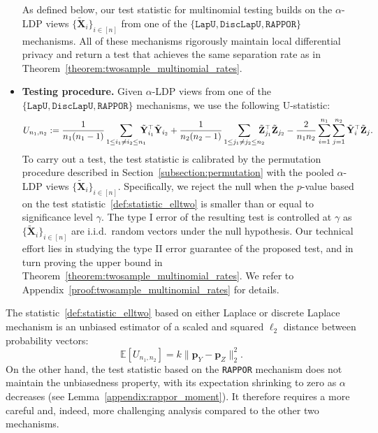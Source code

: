 \documentclass[twoside,11pt]{article}
\newcommand{\rvTwo}{Y}
\newcommand{\rvThree}{Z}
\newcommand{\vectorize}[1]{\mathbf{#1}}
\newcommand{\rvX}{X} %
\newcommand{\rVecX}{\vectorize{\rvX}}
\newcommand{\rVecXPriv}{\tilde{\rVecX}} %
\newcommand{\rvY}{Y}
\newcommand{\rVecY}{\vectorize{\rvY}}
\newcommand{\rvZ}{Z}
\newcommand{\rVecZ}{\vectorize{\rvZ}}
\newcommand{\mE}{\mathbb{E}} %
\newcommand{\alphabetSize}{k} %
\newcommand{\sampleSize}{n}
\newcommand{\probVec}{\mathbf{p}} %
\newcommand{\privacyParameter}{\alpha} %
\begin{document}
\begin{itemize}
As defined below, our test statistic for multinomial testing builds on the $\privacyParameter$-LDP views $\{\rVecXPriv_{i}\}_{i \in [n]}$ from one of the $\{\texttt{LapU}, \texttt{DiscLapU}, \texttt{RAPPOR}\}$ mechanisms. All of these mechanisms rigorously maintain local differential privacy and return a test that achieves the same separation rate as in Theorem~\ref{theorem:twosample_multinomial_rates}. 
\item \textbf{Testing procedure.}
 Given $\privacyParameter$-LDP views from one of the $\{\texttt{LapU}, \texttt{DiscLapU}, \texttt{RAPPOR}\}$ mechanisms, we use the following U-statistic:
\begin{equation}\label{def:statistic_elltwo}
	U_{\sampleSize_1,\sampleSize_2}
	:=
	\frac
	{1}
	{\sampleSize_1(\sampleSize_1-1)}
	\sum_{1 \leq i_1 \neq  i_2 \leq n_1}
\hskip	-3mm
	\tilde{\rVecY}_{i_1}^\top \tilde{\rVecY}_{i_2}
	+
	\frac{1}{\sampleSize_2(\sampleSize_2-1)}
	\sum_{1 \leq j_1 \neq  j_2 \leq n_2}
		\hskip -3mm
	\tilde{\rVecZ}_{j_1}^\top \tilde{\rVecZ}_{j_2}
	-
	\frac{2}{\sampleSize_1\sampleSize_2}
	\sum_{i=1}^{\sampleSize_1} \sum_{j=1}^{\sampleSize_2}
	\tilde{\rVecY}_i^\top \tilde{\rVecZ}_j.
\end{equation}
To carry out a test, the test statistic is calibrated by the permutation procedure described in Section~\ref{subsection:permutation} with the pooled $\privacyParameter$-LDP views $\{\tilde{\rVecX}_i\}_{i \in [n]}$. Specifically, we reject the null when the $p$-value based on the test statistic~\eqref{def:statistic_elltwo} is smaller than or equal to significance level $\gamma$. The type I error of the resulting test is controlled at $\gamma$ as $\{\tilde{\rVecX}_i\}_{i \in [n]}$ are i.i.d.~random vectors under the null hypothesis. Our technical effort lies in studying the type II error guarantee of the proposed test, and in turn proving the upper bound in Theorem~\ref{theorem:twosample_multinomial_rates}. We refer to Appendix~\ref{proof:twosample_multinomial_rates} for details.
\end{itemize}
The statistic~\eqref{def:statistic_elltwo} based on either Laplace or discrete Laplace mechanism is an unbiased estimator of a scaled and squared $\ell_2$ distance between probability vectors:
\begin{equation}\label{equation:lapu_elltwo_unbiased}
	\mE[U_{\sampleSize_1,\sampleSize_2}
	]= \alphabetSize \| \probVec_\rvTwo - \probVec_\rvThree \|_2^2.
\end{equation}
On the other hand, the test statistic based on the \texttt{RAPPOR} mechanism does not maintain the unbiasedness property, with its expectation
shrinking to zero as $\alpha$ decreases (see Lemma~\ref{appendix:rappor_moment}). It therefore requires a more careful and, indeed, more challenging analysis compared to the other two mechanisms.
\end{document}
